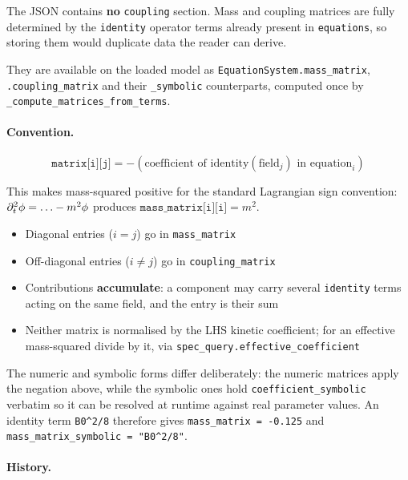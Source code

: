 The JSON contains \textbf{no} \texttt{coupling} section. Mass and coupling
matrices are fully determined by the \texttt{identity} operator terms already
present in \texttt{equations}, so storing them would duplicate data the reader
can derive.

They are available on the loaded model as
\texttt{EquationSystem.mass\_matrix}, \texttt{.coupling\_matrix} and their
\texttt{\_symbolic} counterparts, computed once by
\texttt{\_compute\_matrices\_from\_terms}.

\paragraph{Convention.}
\label{par:json-coupling-convention}

\begin{equation}
  \texttt{matrix[i][j]} = -(\text{coefficient of identity}(\text{field}_j) \text{ in equation}_i)
  \label{eq:matrix-convention}
\end{equation}

This makes mass-squared positive for the standard Lagrangian sign convention:
$\partial_t^2 \phi = \ldots - m^2 \phi$ produces $\texttt{mass\_matrix[i][i]} = m^2$.

\begin{itemize}
  \item Diagonal entries ($i = j$) go in \texttt{mass\_matrix}
  \item Off-diagonal entries ($i \neq j$) go in \texttt{coupling\_matrix}
  \item Contributions \textbf{accumulate}: a component may carry several
        \texttt{identity} terms acting on the same field, and the entry is
        their sum
  \item Neither matrix is normalised by the LHS kinetic coefficient; for an
        effective mass-squared divide by it, via
        \texttt{spec\_query.effective\_coefficient}
\end{itemize}

The numeric and symbolic forms differ deliberately: the numeric matrices apply
the negation above, while the symbolic ones hold
\texttt{coefficient\_symbolic} verbatim so it can be resolved at runtime
against real parameter values. An identity term \texttt{B0\^{}2/8} therefore
gives \texttt{mass\_matrix = -0.125} and
\texttt{mass\_matrix\_symbolic = "B0\^{}2/8"}.

\paragraph{History.}
\label{par:json-coupling-history}

